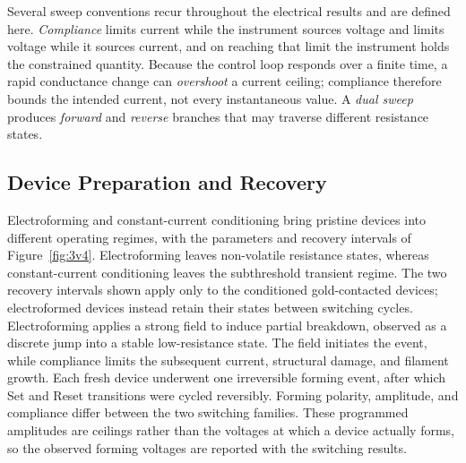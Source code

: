 \noindent Several sweep conventions recur throughout the electrical results and are defined here.
\emph{Compliance} limits current while the instrument sources voltage and limits voltage while it sources current,
and on reaching that limit the instrument holds the constrained quantity. Because the control loop responds over a
finite time, a rapid conductance change can \emph{overshoot} a current ceiling; compliance therefore bounds the
intended current, not every instantaneous value. A \emph{dual sweep} produces \emph{forward} and \emph{reverse}
branches that may traverse different resistance states.

\subsection[Device Preparation and Recovery]{Device Preparation and Recovery}\label{sec:3cond}

\noindent Electroforming and constant-current conditioning bring pristine devices into different operating regimes,
with the parameters and recovery intervals of Figure~\ref{fig:3v4}. Electroforming leaves non-volatile resistance
states, whereas constant-current conditioning leaves the subthreshold transient regime. The two recovery intervals
shown apply only to the conditioned gold-contacted devices; electroformed devices instead retain their states between
switching cycles.\\

\noindent Electroforming applies a strong field to induce partial breakdown, observed as a discrete jump into a
stable low-resistance state. The field initiates the event, while compliance limits the subsequent current,
structural damage, and filament growth. Each fresh device underwent one irreversible forming event, after which Set
and Reset transitions were cycled reversibly. Forming polarity, amplitude, and compliance differ between the two
switching families. These programmed amplitudes are ceilings rather than the voltages at which a device actually
forms, so the observed forming voltages are reported with the switching results.\\

